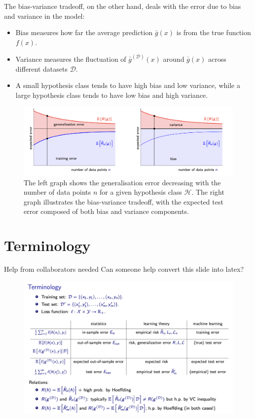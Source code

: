 The bias-variance tradeoff, on the other hand, deals with the error due to bias and variance in the model:
\begin{itemize}
    \item Bias measures how far the average prediction $\bar{g}(x)$ is from the true function $f(x)$.
    \item Variance measures the fluctuation of $\bar{g}^{(\mathcal{D})}(x)$ around $\bar{g}(x)$ across different datasets $\mathcal{D}$.
    \item A small hypothesis class tends to have high bias and low variance, while a large hypothesis class tends to have low bias and high variance.
\end{itemize}

\begin{figure}[H]
    \centering
    \includegraphics[width=1\linewidth]{img/vc_vs_bv.png}
    \caption{The left graph shows the generalisation error decreasing with the number of data points $n$ for a given hypothesis class $\mathcal{H}$. The right graph illustrates the bias-variance tradeoff, with the expected test error composed of both bias and variance components.}
    
\end{figure}

\section{Terminology}
\begin{commentbox}{Help from collaborators needed}
    Can someone help convert this slide into latex?
\begin{figure}[H]
    \centering
    \includegraphics[width=1\linewidth]{img/2_terms.png}
\end{figure}
\end{commentbox}